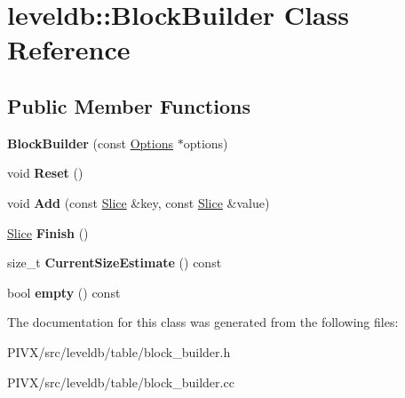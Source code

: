 \hypertarget{classleveldb_1_1_block_builder}{}\section{leveldb\+:\+:Block\+Builder Class Reference}
\label{classleveldb_1_1_block_builder}
\subsection*{Public Member Functions}
\begin{DoxyCompactItemize}
\item 
\mbox{\label{classleveldb_1_1_block_builder_a697ffa03ff6e8f5dec0558c05136f89c}} 
{\bfseries Block\+Builder} (const \mbox{\hyperlink{structleveldb_1_1_options}{Options}} $\ast$options)
\item 
\mbox{\label{classleveldb_1_1_block_builder_a812168608c24de2dfa1651fcdd88e49b}} 
void {\bfseries Reset} ()
\item 
\mbox{\label{classleveldb_1_1_block_builder_a17d0e23f1e7afcb874b22a0cb0b6cf17}} 
void {\bfseries Add} (const \mbox{\hyperlink{classleveldb_1_1_slice}{Slice}} \&key, const \mbox{\hyperlink{classleveldb_1_1_slice}{Slice}} \&value)
\item 
\mbox{\label{classleveldb_1_1_block_builder_ab345ab44def13fb180502e9637b28bcd}} 
\mbox{\hyperlink{classleveldb_1_1_slice}{Slice}} {\bfseries Finish} ()
\item 
\mbox{\label{classleveldb_1_1_block_builder_afad3886f946a9cbe2e147757e49db98b}} 
size\+\_\+t {\bfseries Current\+Size\+Estimate} () const
\item 
\mbox{\label{classleveldb_1_1_block_builder_ab77e58261a06eadc2bc37bec8d390569}} 
bool {\bfseries empty} () const
\end{DoxyCompactItemize}


The documentation for this class was generated from the following files\+:\begin{DoxyCompactItemize}
\item 
P\+I\+V\+X/src/leveldb/table/block\+\_\+builder.\+h\item 
P\+I\+V\+X/src/leveldb/table/block\+\_\+builder.\+cc\end{DoxyCompactItemize}
